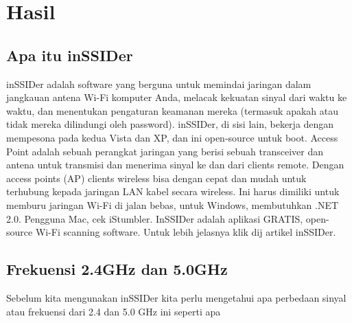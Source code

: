 \documentclass[conference]{IEEEtran}
\begin{document}
\section{Hasil}
\subsection{Apa itu inSSIDer}
inSSIDer adalah software yang berguna untuk memindai jaringan dalam jangkauan antena Wi-Fi komputer Anda, melacak kekuatan sinyal dari waktu ke waktu, dan menentukan pengaturan keamanan mereka (termasuk apakah atau tidak mereka dilindungi oleh password). inSSIDer, di sisi lain, bekerja dengan mempesona pada kedua Vista dan XP, dan ini open-source untuk boot. Access Point adalah sebuah perangkat jaringan yang berisi sebuah transceiver dan antena untuk transmisi dan menerima sinyal ke dan dari clients remote. Dengan access points (AP) clients wireless bisa dengan cepat dan mudah untuk terhubung kepada jaringan LAN kabel secara wireless. Ini harus dimiliki untuk memburu jaringan Wi-Fi di jalan bebas, untuk Windows, membutuhkan .NET 2.0. Pengguna Mac, cek iStumbler. InSSIDer adalah aplikasi GRATIS, open-source Wi-Fi scanning software. Untuk lebih jelasnya klik dij artikel inSSIDer.

\subsection{Frekuensi 2.4GHz dan 5.0GHz}
Sebelum kita mengunakan inSSIDer kita perlu mengetahui apa perbedaan sinyal atau frekuensi dari 2.4 dan 5.0 GHz ini seperti apa 
\vspace{2pt}
\end{document}
